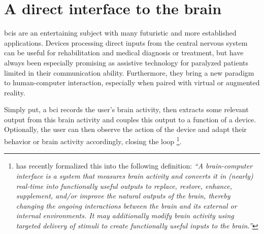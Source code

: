 
\section{A direct interface to the brain}
\ac{bci}s are an entertaining subject with many futuristic and more established
applications.
Devices processing direct inputs from the central nervous system can be
useful for rehabilitation and medical diagnosis or treatment, but
have always been especially promising as assistive technology for
paralyzed patients limited in their communication ability.
Furthermore, they bring a new paradigm to human-computer interaction,
especially when paired with virtual or augmented reality.

Simply put, a \ac{bci} records the user's brain activity, then extracts some
relevant output from this brain activity and couples this output to a function
of a device.
Optionally, the user can then observe the action of the device and adapt their
behavior or brain activity accordingly, closing the loop
\footnote{%
  \textcite{BCISociety2024} has recently formalized this into the
  following definition:
  \it``A brain-computer interface is a system that measures brain activity and
  converts it in (nearly) real-time into functionally useful outputs to replace,
  restore, enhance, supplement, and/or improve the natural outputs of the brain,
  thereby changing the ongoing interactions between the brain and its external or
  internal environments. It may additionally modify brain activity using targeted
  delivery of stimuli to create functionally useful inputs to the
  brain.''
}.


